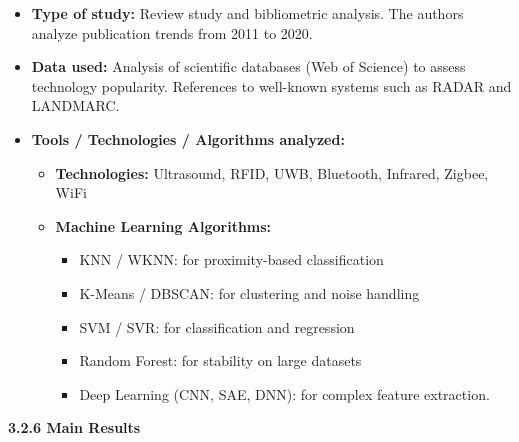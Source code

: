 \documentclass{ipgpmaster}
\begin{document}
\begin{itemize}
    \item \textbf{Type of study:}
 Review study and bibliometric analysis. The authors analyze publication trends from 2011 to 2020. 

    \item \textbf{Data used:}
 Analysis of scientific databases (Web of Science) to assess technology popularity. References to well-known systems such as RADAR and LANDMARC. 

    \item \textbf{Tools / Technologies / Algorithms analyzed:} 

    \begin{itemize}
        \item \textbf{Technologies:} Ultrasound, RFID, UWB, Bluetooth, Infrared, Zigbee, WiFi 

        \item \textbf{Machine Learning Algorithms:} 
        \begin{itemize}
            \item KNN / WKNN: for proximity-based classification 
            \item K-Means / DBSCAN: for clustering and noise handling 
            \item SVM / SVR: for classification and regression 
            \item Random Forest: for stability on large datasets 
            \item Deep Learning (CNN, SAE, DNN): for complex feature extraction.



        \end{itemize}
    \end{itemize}
\end{itemize}
 \textbf{3.2.6  Main Results}
\end{document}
